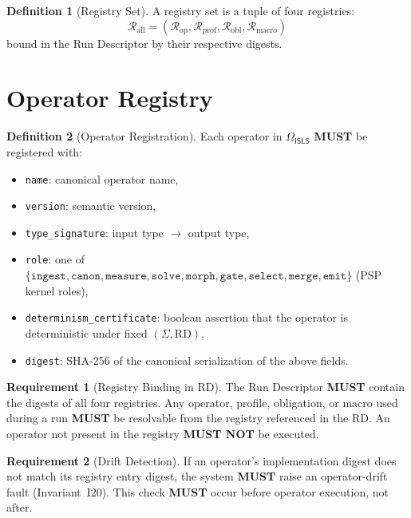 \documentclass[11pt,a4paper,twoside]{article}
\theoremstyle{definition}
\newtheorem{definition}{Definition}[section]
\newtheorem{requirement}{Requirement}[section]
\theoremstyle{plain}
\theoremstyle{remark}
\newcommand{\ISLS}{\textsf{ISLS}}
\newcommand{\calR}{\mathcal{R}}
\newcommand{\OmegaISLS}{\Omega_{\ISLS}}
\begin{document}
\begin{definition}[Registry Set]\label{def:regset}
A registry set is a tuple of four registries:
\[
  \calR_{\mathrm{all}} = (\calR_{\mathrm{op}}, \calR_{\mathrm{prof}},
  \calR_{\mathrm{obl}}, \calR_{\mathrm{macro}})
\]
bound in the Run Descriptor by their respective digests.
\end{definition}

\section{Operator Registry}\label{sec:reg:operator}

\begin{definition}[Operator Registration]\label{def:opreg}
Each operator in $\OmegaISLS$ \textbf{MUST} be registered with:
\begin{itemize}[nosep]
  \item \texttt{name}: canonical operator name,
  \item \texttt{version}: semantic version,
  \item \texttt{type\_signature}: input type $\to$ output type,
  \item \texttt{role}: one of $\{\texttt{ingest}, \texttt{canon},
        \texttt{measure}, \texttt{solve}, \texttt{morph}, \texttt{gate},
        \texttt{select}, \texttt{merge}, \texttt{emit}\}$ (PSP kernel
        roles),
  \item \texttt{determinism\_certificate}: boolean assertion that the
        operator is deterministic under fixed $(\Sigma, \mathrm{RD})$,
  \item \texttt{digest}: SHA-256 of the canonical serialization of the
        above fields.
\end{itemize}
\end{definition}

\begin{requirement}[Registry Binding in RD]\label{req:rdbinding}
The Run Descriptor \textbf{MUST} contain the digests of all four
registries. Any operator, profile, obligation, or macro used during a
run \textbf{MUST} be resolvable from the registry referenced in the RD.
An operator not present in the registry \textbf{MUST NOT} be executed.
\end{requirement}

\begin{requirement}[Drift Detection]\label{req:drift}
If an operator's implementation digest does not match its registry entry
digest, the system \textbf{MUST} raise an operator-drift fault
(Invariant~I20). This check \textbf{MUST} occur before operator
execution, not after.
\end{requirement}
\end{document}
